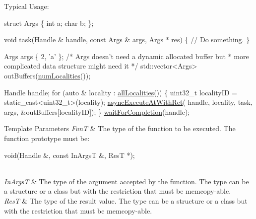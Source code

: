 Typical Usage\-: 
\begin{DoxyCode}
\textcolor{keyword}{struct }Args \{
  \textcolor{keywordtype}{int} a;
  \textcolor{keywordtype}{char} b;
\};

\textcolor{keywordtype}{void} task(Handle & handle, \textcolor{keyword}{const} Args & args, Args * res) \{
  \textcolor{comment}{// Do something.}
\}

Args args \{ 2, \textcolor{charliteral}{'a'} \};
\textcolor{comment}{/* Args doesn't need a dynamic allocated buffer but}
\textcolor{comment}{ * more complicated data structure might need it */}
std::vector<Args> outBuffers(\hyperlink{namespaceshad_1_1rt_a199bb50c21e9012f615520413872aef6}{numLocalities}());

Handle handle;
\textcolor{keywordflow}{for} (\textcolor{keyword}{auto} & locality : \hyperlink{namespaceshad_1_1rt_adea42bceb84b2161df8fece9d20cb7cf}{allLocalities}()) \{
  uint32\_t localityID = \textcolor{keyword}{static\_cast<}uint32\_t\textcolor{keyword}{>}(locality);
  \hyperlink{namespaceshad_1_1rt_a5ef970b04fc171862dc8b0c4cb6308d4}{asyncExecuteAtWithRet}(
    handle, locality, task, args, &outBuffers[localityID]);
\}
\hyperlink{namespaceshad_1_1rt_a6ea1d3672bac3a80032863b6732a0c0a}{waitForCompletion}(handle);
\end{DoxyCode}
 
\begin{DoxyTemplParams}{Template Parameters}
{\em Fun\-T} & The type of the function to be executed. The function prototype must be\-: 
\begin{DoxyCode}
void(Handle &, \textcolor{keyword}{const} InArgsT &, ResT *);
\end{DoxyCode}
\\
\hline
{\em In\-Args\-T} & The type of the argument accepted by the function. The type can be a structure or a class but with the restriction that must be memcopy-\/able.\\
\hline
{\em Res\-T} & The type of the result value. The type can be a structure or a class but with the restriction that must be memcopy-\/able.\\
\hline
\end{DoxyTemplParams}


